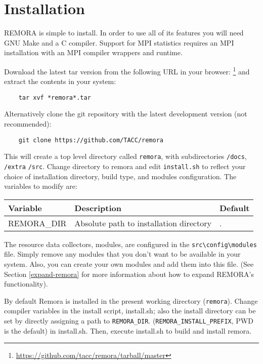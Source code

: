 \documentclass[10pt,a4paper]{report}
\begin{document}
\tableofcontents

\chapter{Installation}
REMORA is simple to install. 
In order to use all of its features you will need GNU Make and a C compiler. 
Support for MPI statistics requires an MPI installation with an MPI compiler wrappers and runtime.

Download the latest tar version from the following URL in your  browser:
\footnote{\href{https://github.com/tacc/remora/tarball/master}
{https://github.com/tacc/remora/tarball/master}} 
and extract the contents in your system:

\begin{verbatim}
    tar xvf *remora*.tar
\end{verbatim}

Alternatively clone the git repository with the latest development version (not recommended):

\begin{verbatim}
    git clone https://github.com/TACC/remora
\end{verbatim}

This will create a top level directory called \verb+remora+, 
with subdirectories \verb+/docs+, \verb+/extra+ \verb+/src+. 
Change directory to remora and edit \verb+install.sh+ to reflect your choice of installation directory, build type, and modules configuration. The variables to modify are:

\begin{table}[h]
\centering
\label{tab:env}
\begin{tabular}{|l|l|l|}
\hline
\bf{Variable}	& \bf{Description}                          & \bf{Default}\\\hline
REMORA\_DIR     & Absolute path to installation directory   & . \\\hline
\end{tabular}
\end{table}

The resource data collectors, modules, are configured in the \verb+src\config\modules+ file. 
Simply remove any modules that you don't want to be available in your system. 
Also, you can create your own modules and add them into this file.
(See Section \ref{expand-remora} for more information about how to expand REMORA's functionality).

By default Remora is installed in the present working directory (\verb+remora+).
Change compiler variables in the install script, install.sh; also the install directory
can be set by directly assigning a path to \verb|REMORA_DIR|.
(\verb|REMORA_INSTALL_PREFIX|, PWD is the default) in install.sh.
Then, execute install.sh to build and install remora.
\end{document}
